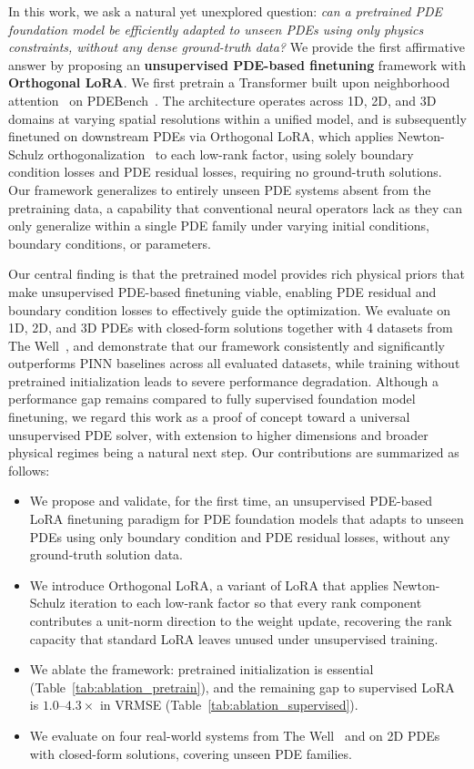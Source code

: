 \documentclass{article}
\begin{document}
In this work, we ask a natural yet unexplored question: \emph{can a pretrained PDE foundation model be efficiently adapted to unseen PDEs using only physics constraints, without any dense ground-truth data?} We provide the first affirmative answer by proposing an \textbf{unsupervised PDE-based finetuning} framework with \textbf{Orthogonal LoRA}. We first pretrain a Transformer built upon neighborhood attention~\cite{hassani2023neighborhood} on PDEBench~\cite{takamoto2022pdebench}. The architecture operates across 1D, 2D, and 3D domains at varying spatial resolutions within a unified model, and is subsequently finetuned on downstream PDEs via Orthogonal LoRA, which applies Newton-Schulz orthogonalization~\cite{jordan2024muon} to each low-rank factor, using solely boundary condition losses and PDE residual losses, requiring no ground-truth solutions. Our framework generalizes to entirely unseen PDE systems absent from the pretraining data, a capability that conventional neural operators lack as they can only generalize within a single PDE family under varying initial conditions, boundary conditions, or parameters.


Our central finding is that the pretrained model provides rich physical priors that make unsupervised PDE-based finetuning viable, enabling PDE residual and boundary condition losses to effectively guide the optimization. We evaluate on 1D, 2D, and 3D PDEs with closed-form solutions together with 4 datasets from The Well~\cite{ohana2024thewell}, and demonstrate that our framework consistently and significantly outperforms PINN baselines across all evaluated datasets, while training without pretrained initialization leads to severe performance degradation. Although a performance gap remains compared to fully supervised foundation model finetuning, we regard this work as a proof of concept toward a universal unsupervised PDE solver, with extension to higher dimensions and broader physical regimes being a natural next step. Our contributions are summarized as follows:
\begin{itemize}
    \item We propose and validate, for the first time, an unsupervised PDE-based LoRA finetuning paradigm for PDE foundation models that adapts to unseen PDEs using only boundary condition and PDE residual losses, without any ground-truth solution data.
    \item We introduce Orthogonal LoRA, a variant of LoRA that applies Newton-Schulz iteration to each low-rank factor so that every rank component contributes a unit-norm direction to the weight update, recovering the rank capacity that standard LoRA leaves unused under unsupervised training.
    \item We ablate the framework: pretrained initialization is essential (Table~\ref{tab:ablation_pretrain}), and the remaining gap to supervised LoRA is $1.0$--$4.3\times$ in VRMSE (Table~\ref{tab:ablation_supervised}).
    \item We evaluate on four real-world systems from The Well~\cite{ohana2024thewell} and on 2D PDEs with closed-form solutions, covering unseen PDE families.
\end{itemize}
\end{document}
